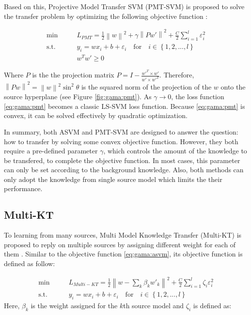 Based on this, Projective Model Transfer SVM (PMT-SVM) is proposed to solve the transfer problem by optimizing the following objective function \cite{aytar2011tabula}:

\begin{equation}\label{eq:gama:pmt}
\begin{aligned}
\min \qquad& {L_{PMT}} = \frac{1}{2}{\left\| w \right\|^2} + \gamma {\left\| {Pw'} \right\|^2} + \frac{C}{2}\sum\limits_{i = 1}^l {\varepsilon _i^2} \\
\text{s.t.}\qquad&{y_i} = w{x_i} + b + {\varepsilon _i} \quad   \text{for} \quad i \in \left\{ {1,2,...,l} \right\}\\
& w^Tw' \ge 0
\end{aligned}
\end{equation}

Where $P$ is the the projection matrix $P = I - \frac{{w{'^T} \times w'}}{{w' \times w{'^T}}}$. Therefore, ${\left\| {Pw} \right\|^2} = {\left\| w \right\|^2}{\sin ^2}\theta $ is the
squared norm of the projection of the $w$ onto the source hyperplane (see Figure \ref{fig:gama:pmt}). As $\gamma \rightarrow 0$, the loss function \eqref{eq:gama:pmt} becomes a classic LS-SVM loss function. Because \eqref{eq:gama:pmt} is convex, it can be solved effectively by quadratic optimization.

In summary, both ASVM and PMT-SVM are designed to answer the question: how to transfer by solving some convex objective function. However, they both require a pre-defined parameter $\gamma$, which controls the amount of the knowledge to be transfered, to complete the objective function. In most cases, this parameter can only be set according to the background knowledge. Also, both methods can only adopt the knowledge from single source model which limits the their performance. 
\subsection{Multi-KT}
To learning from many sources, Multi Model Knowledge Transfer (Multi-KT) is proposed to reply on multiple sources by assigning different weight for each of them \cite{tommasi2014learning}. Similar to the objective function \eqref{eq:gama:asvm}, its objective function is defined as follow: 

\begin{equation}\label{eq:gama:multi}
\begin{aligned}
\min \qquad& {L_{Multi - KT}} = \frac{1}{2}{\left\| {w - \sum\limits_k {{\beta _k}} {{w'}_k}} \right\|^2} + \frac{C}{2}\sum\limits_{i = 1}^l {{\zeta _i}\varepsilon _i^2}  \\
\text{s.t.}\qquad&{y_i} = w{x_i} + b + {\varepsilon _i} \quad   \text{for} \quad i \in \left\{ {1,2,...,l} \right\}
\end{aligned}
\end{equation}
Here, $\beta_k$ is the weight assigned for the $k$th source model and $\zeta _i$ is defined as:

